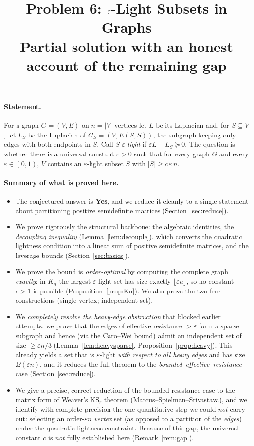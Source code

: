 \documentclass[12pt]{article}
\title{Problem 6: $\eps$-Light Subsets in Graphs\\
\large Partial solution with an honest account of the remaining gap}
\date{}
\theoremstyle{definition}
\newcommand{\eps}{\varepsilon}
\newcommand{\psd}{\succeq 0}
\begin{document}
\maketitle

\paragraph{Statement.}
For a graph $G=(V,E)$ on $n=|V|$ vertices let $L$ be its Laplacian and, for $S\subseteq V$, let
$L_S$ be the Laplacian of $G_S=(V,E(S,S))$, the subgraph keeping only edges with both endpoints in
$S$. Call $S$ \emph{$\eps$-light} if $\eps L-L_S\psd$. The question is whether there is a universal
constant $c>0$ such that for every graph $G$ and every $\eps\in(0,1)$, $V$ contains an $\eps$-light
subset $S$ with $|S|\ge c\,\eps\,n$.

\paragraph{Summary of what is proved here.}
\begin{itemize}
\item[(A)] The conjectured answer is \textbf{Yes}, and we reduce it cleanly to a single statement
about partitioning positive semidefinite matrices (Section~\ref{sec:reduce}).
\item[(B)] We prove rigorously the structural backbone: the algebraic identities, the
\emph{decoupling inequality} (Lemma~\ref{lem:decouple}), which converts the quadratic lightness
condition into a linear sum of positive semidefinite matrices, and the leverage bounds
(Section~\ref{sec:basics}).
\item[(C)] We prove the bound is \emph{order-optimal} by computing the complete graph \emph{exactly}:
in $K_n$ the largest $\eps$-light set has size exactly $\lfloor\eps n\rfloor$, so no constant $c>1$ is
possible (Proposition~\ref{prop:Kn}). We also prove the two free constructions (single vertex;
independent set).
\item[(D)] We \emph{completely resolve the heavy-edge obstruction} that blocked earlier
attempts: we prove that the edges of effective resistance $>\eps$ form a sparse subgraph and hence
(via the Caro--Wei bound) admit an independent set of size $\ge \eps n/3$
(Lemma~\ref{lem:heavysparse}, Proposition~\ref{prop:heavy}). This already yields a set that is
$\eps$-light \emph{with respect to all heavy edges} and has size $\Omega(\eps n)$, and it reduces the
full theorem to the \emph{bounded--effective--resistance} case (Section~\ref{sec:reduce}).
\item[(E)] We give a precise, correct reduction of the bounded-resistance case to the matrix form of
Weaver's $\mathrm{KS}_r$ theorem (Marcus--Spielman--Srivastava), and we identify with complete
precision the one quantitative step we could \emph{not} carry out: selecting an order-$\eps n$
\emph{vertex} set (as opposed to a partition of the \emph{edges}) under the quadratic lightness
constraint. Because of this gap, the universal constant $c$ is \emph{not} fully established here
(Remark~\ref{rem:gap}).
\end{itemize}
\end{document}
